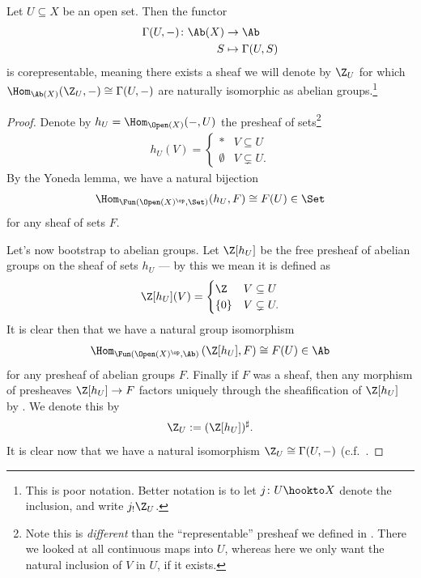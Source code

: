 \documentclass[11pt]{amsart}
\begin{document}
\begin{example}
\label{exa:ZU-sheaf}
Let $U \subseteq X$ be an open set. Then the functor
\begin{align*}
    \Gamma(U,-) \colon \Ab(X) &\to \Ab \\
    S &\mapsto \Gamma(U,S)
\end{align*}
is corepresentable, meaning there exists a sheaf we will denote by $\Z_U$ for which $\Hom_{\Ab(X)}(\Z_U,-) \cong \Gamma(U,-)$ are naturally isomorphic as abelian groups.\footnote{This is poor notation. Better notation is to let $j \colon U \hookto X$ denote the inclusion, and write $j_! \Z_U$.}
\end{example}
\begin{proof}
Denote by $h_U = \Hom_{\Open(X)}(-,U)$ the presheaf of sets\footnote{Note this is \emph{different} than the ``representable'' presheaf we defined in . There we looked at all continuous maps into $U$, whereas here we only want the natural inclusion of $V$ in $U$, if it exists.}
\begin{align*}
    h_U(V) = \begin{cases} \ast & V \subseteq U \\ \emptyset & V \subsetneq U. \end{cases}
\end{align*}
By the Yoneda lemma, we have a natural bijection
\begin{align*}
    \Hom_{\Fun(\Open(X)^\op,\Set)}(h_U,F) \cong F(U) \in \Set
\end{align*}
for any sheaf of sets $F$.

Let's now bootstrap to abelian groups. Let $\Z[h_U]$ be the free presheaf of abelian groups on the sheaf of sets $h_U$ --- by this we mean it is defined as
\begin{align*}
    \Z[h_U](V) = \begin{cases} \Z & V \subseteq U \\ \{0\} & V \subsetneq U. \end{cases}
\end{align*}
It is clear then that we have a natural group isomorphism
\begin{align*}
    \Hom_{\Fun(\Open(X)^\op,\Ab)} \left( \Z[h_U],F \right)\cong F(U) \in \Ab
\end{align*}
for any presheaf of abelian groups $F$. Finally if $F$ was a sheaf, then any morphism of presheaves $\Z[h_U] \to F$ factors uniquely through the sheafification of $\Z[h_U]$ by . We denote this by
\begin{align*}
    \Z_U := (\Z[h_U])^\sharp.
\end{align*}
It is clear now that we have a natural isomorphism $\Z_U\cong\Gamma(U,-)$ (c.f.~\cite[03CP,03CQ]{Stacks}.
\end{proof}
\end{document}
